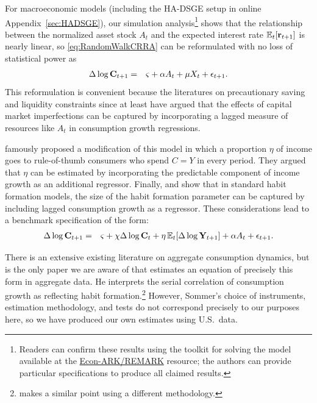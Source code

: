 For macroeconomic models (including the HA-DSGE setup in online Appendix~\ref{sec:HADSGE}), our simulation analysis\footnote{Readers can confirm these results using the toolkit for solving the model available at the \href{https://github.com/econ-ark/REMARK/tree/master/REMARKs/cAndCwithStickyE}{Econ-ARK/REMARK} resource; the authors can provide particular specifications to produce all claimed results.}
shows that the relationship between the normalized asset stock $A_{t}$ and the expected interest rate $\operatorname{\mathbb{E}}_{t}[\mathbf{r}_{t+1}]$ is nearly linear, so \eqref{eq:RandomWalkCRRA} can be reformulated with no loss of statistical power as
\begin{eqnarray*}
  \label{eq:RandomWalkAForm}
  \Delta \log \mathbf{C}_{t+1} & = & \varsigma+\alpha A_{t}+\mu X_{t}+\epsilon_{t+1}.
\end{eqnarray*}
This reformulation is convenient because the literatures on precautionary saving and liquidity constraints since at least \cite{zeldes:jpe,zeldesStochastic} have argued that the effects of capital market imperfections can be captured by incorporating a lagged measure of resources like $A_{t}$ in consumption growth regressions.

\cite{cmModel} famously proposed a modification of this model in which a proportion $\eta$ of income goes to rule-of-thumb consumers who spend $C=Y$ in every period.  They argued that $\eta$ can be estimated by incorporating the predictable component of income growth as an additional regressor.  Finally, \cite{dynanHabits} and \cite{som07} show that in standard habit formation models, the size of the habit formation parameter can be captured by including lagged consumption growth as a regressor.  These considerations lead to a benchmark specification of the form:
\begin{eqnarray}
  \label{eq:CGrowBench}
  \Delta \log \mathbf{C}_{t+1} & = & \varsigma+\chi \Delta \log \mathbf{C}_{t}+\eta \operatorname{\mathbb{E}}_{t}[\Delta \log \mathbf{Y}_{t+1}]+\alpha A_{t}+\epsilon_{t+1}.
\end{eqnarray}

There is an extensive existing literature on aggregate consumption dynamics, but \cite{som07} is the only paper we are aware of that estimates an equation of precisely this form in aggregate data.  He interprets the serial correlation of consumption growth as reflecting habit formation.\footnote{\cite{weber:ruleofthumb} makes a similar point using a different methodology.}  However, Sommer's choice of instruments, estimation methodology, and tests do not correspond precisely to our purposes here, so we have produced our own estimates using U.S.\ data.

